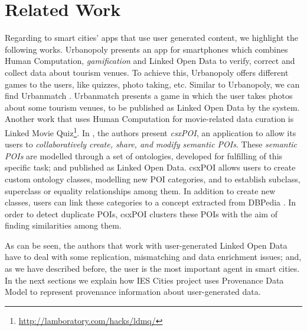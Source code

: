\section{Related Work}
\label{sec:state_of_the_art}

Regarding to smart cities' apps that use user generated content, we highlight the following works. Urbanopoly \cite{celino_urbanopoly_2012} presents an app for smartphones which combines Human Computation, \textit{gamification} and Linked Open Data to verify, correct and collect data about tourism venues. To achieve this, Urbanopoly offers different games to the users, like quizzes, photo taking, etc. Similar to Urbanopoly, we can find Urbanmatch \cite{celino_urbanmatch_2012}. Urbanmatch presents a game in which the user takes photos about some tourism venues, to be published as Linked Open Data by the system. Another work that uses Human Computation for movie-related data curation is Linked Movie Quiz\footnote{\url{http://lamboratory.com/hacks/ldmq/}}. In \cite{braun_collaborative_2007}, the authors present \textit{csxPOI}, an application to allow its users to \textit{collaboratively create, share, and modify semantic POIs}. These \textit{semantic POIs} are modelled through a set of ontologies, developed for fulfilling of this specific task; and published as Linked Open Data. csxPOI allows users to create custom ontology classes, modelling new POI categories, and to establish subclass, superclass or equality relationships among them. In addition to create new classes, users can link these categories to a concept extracted from DBPedia \cite{auer_dbpedia:_2007}. In order to detect duplicate POIs, csxPOI clusters these POIs with the aim of finding similarities among them.

As can be seen, the authors that work with user-generated Linked Open Data have to deal with some replication, mismatching and data enrichment issues; and, as we have described before, the user is the most important agent in smart cities. In the next sections we explain how IES Cities project uses Provenance Data Model to represent provenance information about user-generated data.
